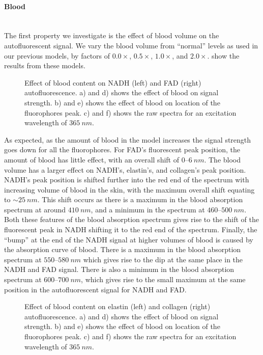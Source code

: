 \paragraph*{Blood}\hspace{0pt}\\
The first property we investigate is the effect of blood volume on the autofluorescent signal.
We vary the blood volume from ``normal'' levels as used in our previous models, by factors of $0.0\times$, $0.5\times$, $1.0\times$, and $2.0\times$.
 show the results from these models.

\begin{figure}[!htbp]
    \centering
    \caption{Effect of blood content on NADH (left) and FAD (right) autofluorescence. a) and d) shows the effect of blood on signal strength. b) and e) shows the effect of blood on location of the fluorophores peak. c) and f) shows the raw spectra for an excitation wavelength of $365~nm$.}%
    \label{fig:nadhfad-blood}%
\end{figure}

As expected, as the amount of blood in the model increases the signal strength goes down for all the fluorophores.
For FAD's fluorescent peak position, the amount of blood has little effect, with an overall shift of $0$--$6~nm$.
The blood volume has a larger effect on NADH's, elastin's, and collagen's peak position.
NADH's peak position is shifted further into the red end of the spectrum with increasing volume of blood in the skin, with the maximum overall shift equating to $\sim25~nm$.
This shift occurs as there is a maximum in the blood absorption spectrum at around $410~nm$, and a minimum in the spectrum at $460$--$500~nm$.
Both these features of the blood absorption spectrum gives rise to the shift of the fluorescent peak in NADH shifting it to the red end of the spectrum.
Finally, the ``bump'' at the end of the NADH signal at higher volumes of blood is caused by the absorption curve of blood.
There is a maximum in the blood absorption spectrum at $550$--$580~nm$ which gives rise to the dip at the same place in the NADH and FAD signal.
There is also a minimum in the blood absorption spectrum at $600$--$700~nm$, which gives rise to the small maximum at the same position in the autofluorescent signal for NADH and FAD.

\begin{figure}[!htbp]
    \centering
    \caption{Effect of blood content on elastin (left) and collagen (right) autofluorescence. a) and d) shows the effect of blood on signal strength. b) and e) shows the effect of blood on location of the fluorophores peak. c) and f) shows the raw spectra for an excitation wavelength of $365~nm$.}%
    \label{fig:elscol-blood}%
\end{figure}

